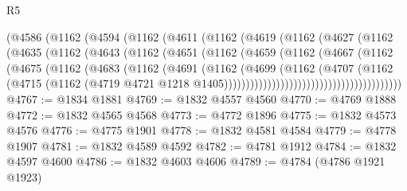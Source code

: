 \begin{lexlean}{R5}
\begin{coremodule}
                    (@4586
                      (@1162
                        (@4594
                          (@1162
                            (@4611
                              (@1162
                                (@4619
                                  (@1162
                                    (@4627
                                      (@1162
                                        (@4635
                                          (@1162
                                            (@4643
                                              (@1162
                                                (@4651
                                                  (@1162
                                                    (@4659
                                                      (@1162
                                                        (@4667
                                                          (@1162
                                                            (@4675
                                                              (@1162
                                                                (@4683
                                                                  (@1162
                                                                    (@4691
                                                                      (@1162
                                                                        (@4699
                                                                          (@1162
                                                                            (@4707
                                                                              (@1162
                                                                                (@4715
                                                                                  (@1162
                                                                                    (@4719
                                                                                      @4721
                                                                                      @1218
                                                                                      @1405)))))))))))))))))))))))))))))))))))))))))
@4767 := @1834 @1881
@4769 := @1832 @4557 @4560
@4770 := @4769 @1888
@4772 := @1832 @4565 @4568
@4773 := @4772 @1896
@4775 := @1832 @4573 @4576
@4776 := @4775 @1901
@4778 := @1832 @4581 @4584
@4779 := @4778 @1907
@4781 := @1832 @4589 @4592
@4782 := @4781 @1912
@4784 := @1832 @4597 @4600
@4786 := @1832 @4603 @4606
@4789 := @4784 (@4786 @1921 @1923)

\end{coremodule}
\end{lexlean}
